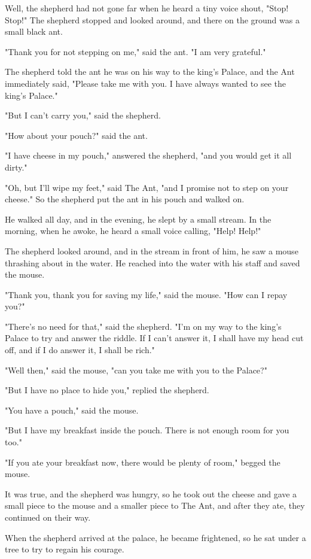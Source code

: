 Well, the shepherd had not gone far when he heard a tiny voice shout, "Stop! Stop!" The shepherd stopped and looked around, and there on the ground was a small black ant.

"Thank you for not stepping on me," said the ant. "I am very grateful."

The shepherd told the ant he was on his way to the king's Palace, and the Ant immediately said, "Please take me with you. I have always wanted to see the king's Palace."

"But I can't carry you," said the shepherd.

"How about your pouch?" said the ant.

"I have cheese in my pouch," answered the shepherd, "and you would get it all dirty."

"Oh, but I'll wipe my feet," said The Ant, "and I promise not to step on your cheese." So the shepherd put the ant in his pouch and walked on.

He walked all day, and in the evening, he slept by a small stream. In the morning, when he awoke, he heard a small voice calling, "Help! Help!"

The shepherd looked around, and in the stream in front of him, he saw a mouse thrashing about in the water. He reached into the water with his staff and saved the mouse.

"Thank you, thank you for saving my life," said the mouse. "How can I repay you?"

"There's no need for that," said the shepherd. "I'm on my way to the king's Palace to try and answer the riddle. If I can't answer it, I shall have my head cut off, and if I do answer it, I shall be rich."

"Well then," said the mouse, "can you take me with you to the Palace?"

"But I have no place to hide you," replied the shepherd.

"You have a pouch," said the mouse.

"But I have my breakfast inside the pouch. There is not enough room for you too."

"If you ate your breakfast now, there would be plenty of room," begged the mouse.

It was true, and the shepherd was hungry, so he took out the cheese and gave a small piece to the mouse and a smaller piece to The Ant, and after they ate, they continued on their way.

When the shepherd arrived at the palace, he became frightened, so he sat under a tree to try to regain his courage.

